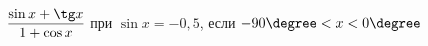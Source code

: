 \begin{ex}[type=simplify_calculate]
	\begin{condition}
		\( \dfrac{\sin x+\tg x}{1+\cos x} \) при \( \sin x=-0,5 \), \quad если \( -90\degree<x<0\degree \)
	\end{condition}
\end{ex}